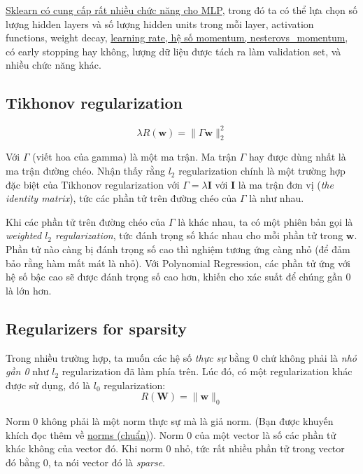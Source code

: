 \href{http://scikit-learn.org/stable/modules/neural_networks_supervised.html}{Sklearn có cung cấp rất nhiều chức năng cho MLP}, trong đó ta có thể lựa chọn số lượng hidden layers và số lượng hidden units trong mỗi layer, activation functions, weight decay, \href{http://machinelearningcoban.com/2017/01/16/gradientdescent2/}{learning rate, hệ số momentum, nesterovs\_momentum}, có early stopping hay không, lượng dữ liệu được tách ra làm validation set, và nhiều chức năng khác. 
 
 
\subsection{Tikhonov regularization}
\begin{equation*} 
\lambda R(\mathbf{w}) = \|\Gamma \mathbf{w}\|_2^2 
\end{equation*} 
 
Với $\Gamma$ (viết hoa của gamma) là một ma trận. Ma trận $\Gamma$ hay được dùng nhất là ma trận đường chéo. Nhận thấy rằng $l_2$ regularization chính là một trường hợp đặc biệt của Tikhonov regularization với $\Gamma = \lambda \mathbf{I}$ với $\mathbf{I}$ là ma trận đơn vị (\textit{the identity matrix}), tức các phần tử trên đường chéo của $\Gamma$ là như nhau. 
 
Khi các phần tử trên đường chéo của $\Gamma$ là khác nhau, ta có một phiên bản gọi là \textit{weighted $l_2$ regularization}, tức đánh trọng số khác nhau cho mỗi phần tử trong $\mathbf{w}$. Phần tử nào càng bị đánh trọng số cao thì nghiệm tương ứng càng nhỏ (để đảm bảo rằng hàm mất mát là nhỏ). Với Polynomial Regression, các phần tử ứng với hệ số bậc cao sẽ được đánh trọng số cao hơn, khiến cho xác suất để chúng gần 0 là lớn hơn. 
 
 
\subsection{Regularizers for sparsity}
 
Trong nhiều trường hợp, ta muốn các hệ số \textit{thực sự} bằng 0 chứ không phải là \textit{nhỏ gần 0} như $l_2$ regularization đã làm phía trên. Lúc đó, có một regularization khác được sử dụng, đó là $l_0$ regularization: 
\begin{equation*} 
R(\mathbf{W}) = \|\mathbf{w}\|_0 
\end{equation*} 
 
Norm 0 không phải là một norm thực sự mà là giả norm. (Bạn được khuyến khích đọc thêm về \href{http://machinelearningcoban.com/math/#norms-chuan}{norms (chuẩn)}). Norm 0 của một vector là số các phần tử khác không của vector đó. Khi norm 0 nhỏ, tức rất nhiều phần tử trong vector đó bằng 0, ta nói vector đó là \textit{sparse}. 
 
